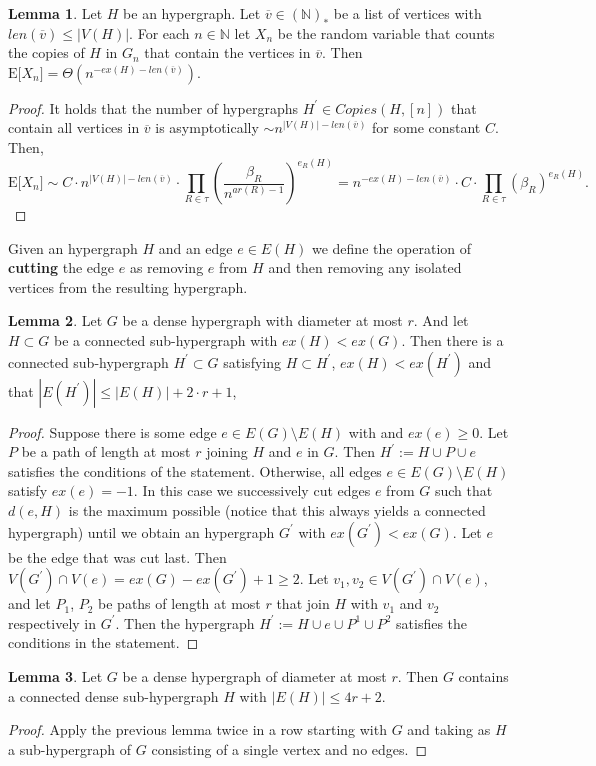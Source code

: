 \documentclass[12pt,notitlepage,a4paper]{article}
\theoremstyle{definition}
\newtheorem{lemma}{Lemma}[section]
\newcommand{\N}{\mathbb{N}}
\newcommand{\sep}{\noindent\rule{2cm}{0.4pt}}
\begin{document}
\begin{lemma}\label{lem:nocopiesfixed}
	Let $H$ be an hypergraph. Let
	$\overline{v}\in (\N)_*$ be a list of vertices
	with $len(\overline{v})\leq |V(H)|$.
	For each $n\in \N$ 
	let $X_n$ be the random variable that
	counts the copies of $H$ in $G_n$ that contain the vertices
	in $\overline{v}$. Then
	$
	\mathrm{E}\big[ X_n \big]=\Theta(n^{-ex(H)-len(\overline{v})})$.
\end{lemma}
\begin{proof}
	It holds that the number of hypergraphs $H^\prime \in Copies(H,[n])$
	that contain all vertices in $\overline{v}$ is asymptotically
	$\sim n^{|V(H)|-len(\overline{v})}$ for
	some constant $C$. Then,
	\[
	\mathrm{E}\big[ X_n \big]\sim 
	C \cdot n^{|V(H)|-len(\overline{v})}
	\cdot\prod_{R\in\tau} \left( \frac{\beta_R}{n^{ar(R)-1}}\right)^{e_R(H)}=
	n^{-ex(H)-len(\overline{v})}\cdot C \cdot
	\prod_{R\in\tau} \left( \beta_R \right)^{e_R(H)}.
	\]
\end{proof}




	Given an hypergraph $H$ and an edge $e\in E(H)$ we
	define the operation of \textbf{cutting} the edge 
	$e$ as removing $e$ from $H$ and then removing any isolated
	vertices from the resulting hypergraph. \par

\begin{lemma}
	Let $G$ be a
	dense hypergraph with diameter at most $r$.
	And let $H\subset G$ be a connected 
	sub-hypergraph with $ex(H)<ex(G)$. Then
	there is a connected
	sub-hypergraph $H^\prime \subset G$
	satisfying $H\subset H^\prime$,
	$ex(H)<ex(H^\prime)$ and that 
	$|E(H^\prime)|\leq |E(H)|+2\cdot r + 1$, 
\end{lemma}
\begin{proof}
	Suppose there is some edge $e\in E(G)\setminus E(H)$ with
	and $ex(e)\geq 0$. Let $P$ be a path
	of length at most $r$ joining $H$ and $e$ in $G$. 
	Then $H^\prime:=H\cup P \cup e$ satisfies the conditions of 
	the statement. Otherwise, all edges $e\in E(G)\setminus E(H)$ 
	satisfy $ex(e)=-1$. In this case we successively cut
	edges $e$ from $G$ such that $d(e, H)$ is the maximum possible
	(notice that this always yields a connected hypergraph)
	until we obtain an hypergraph $G^\prime$ with $ex(G^\prime)<ex(G)$.
	Let $e$ be the edge that was cut last. Then $V(G^\prime)\cap V(e)=
	ex(G)-ex(G^\prime)+1 \geq 2$. Let $v_1, v_2\in V(G^\prime)\cap V(e)$,
	and let $P_1$, $P_2$ be paths of length at most $r$ that join $H$
	with $v_1$ and $v_2$ respectively in $G^\prime$. Then the hypergraph
	$H^\prime:=H\cup e \cup P^1 \cup P^2$ satisfies the conditions 
	in the statement. 
\end{proof}
\begin{lemma}
	Let $G$ be a
	dense hypergraph of diameter at most 
	$r$. Then $G$ contains a connected 
	dense sub-hypergraph $H$ 
	with $|E(H)|\leq 4r+2$. 
\end{lemma}
\begin{proof}
	Apply the previous lemma twice in a row starting with $G$ and taking
	as $H$ a sub-hypergraph of $G$ consisting of a single vertex and 
	no edges. 
\end{proof}
\end{document}
